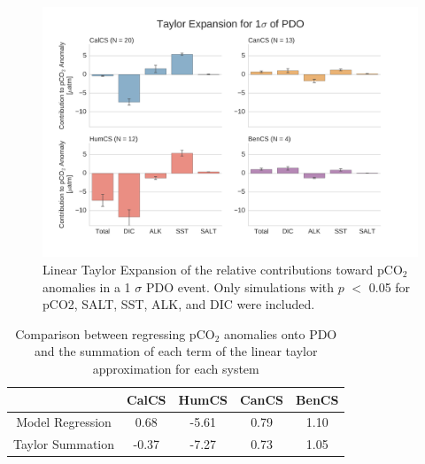\documentclass[12pt]{article}
\begin{document}
\clearpage
\begin{figure}[!h]
	\centering
	\includegraphics[width=\linewidth]{../../figs/all-systems/taylor_expansions/taylor-expansion-PDO-pCO2-PVALUEREMOVED-smoothedClimate.png}
	\caption{Linear Taylor Expansion of the relative contributions toward pCO$_{2}$ anomalies in a 1 $\sigma$ PDO event. Only simulations with $p$ $<$ 0.05 for pCO2, SALT, SST, ALK, and DIC were included.}
	\label{fig:taylor-pdo}
\end{figure}
\begin{table}[!h]
	\centering
	\begin{tabular}{c | c c c c }
		& CalCS & HumCS & CanCS & BenCS \\
		\midrule
		Model Regression & 0.68 & -5.61 & 0.79 & 1.10 \\
		Taylor Summation & -0.37 & -7.27 & 0.73 & 1.05 \\
	\end{tabular}
	\caption{Comparison between regressing pCO$_{2}$ anomalies onto PDO and the summation of each term of the linear taylor approximation for each system}
	\label{tab:taylor-pdo}
\end{table}
\end{document}
